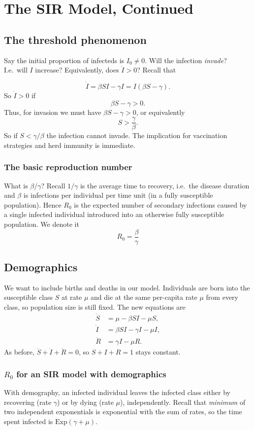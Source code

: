 \chapter{The SIR Model, Continued}

\section{The threshold phenomenon}

Say the initial proportion of infecteds is $I_0 \ne 0$. Will the
infection \emph{invade}? I.e.~will $I$ increase? Equivalently, does
$\dot I>0$? Recall that

\[
\dot I = \beta S I - \gamma I = I(\beta S - \gamma).
\]
So  $\dot{I} > 0$ if 
\[
\beta S - \gamma  > 0.
\]
Thus, for invasion we must have $\beta S - \gamma > 0$, or
equivalently
\[
S > \frac{\gamma}{\beta}.
\]
So if $S<\gamma/\beta$ the infection cannot invade. The implication
for vaccination strategies and herd immunity is immediate.

\subsection{The basic reproduction number}
What is $\beta/\gamma$? Recall $1/\gamma$ is the average time to
recovery, i.e.\ the disease duration and $\beta$ is infections per
individual per time unit (in a fully susceptible population). Hence
$R_0$ is the expected number of secondary infections caused by a
single infected individual introduced into an otherwise fully
susceptible population. We denote it
\[
R_0 = \frac{\beta}{\gamma}
\]


\section{Demographics}
We want to include births and deaths in our model. Individuals are
born into the susceptible class $S$ at rate $\mu$ and die at the same
per-capita rate $\mu$ from every class, so population size is still
fixed. The new equations are
\begin{align*}
\dot S &= \mu - \beta S I - \mu S, \\
\dot I &= \beta S I - \gamma I -\mu I, \\
\dot R &= \gamma I - \mu R.
\end{align*}
As before, $\dot S + \dot I + \dot R = 0$, so $S+I+R=1$ stays
constant.

\subsection{$R_0$ for an SIR model with demographics}
With demography, an infected individual leaves the infected class
either by recovering (rate $\gamma$) or by dying (rate $\mu$),
independently. Recall that \emph{minimum} of two independent
exponentials is exponential with the sum of rates, so the time spent
infected is $\text{Exp}(\gamma+\mu)$.

